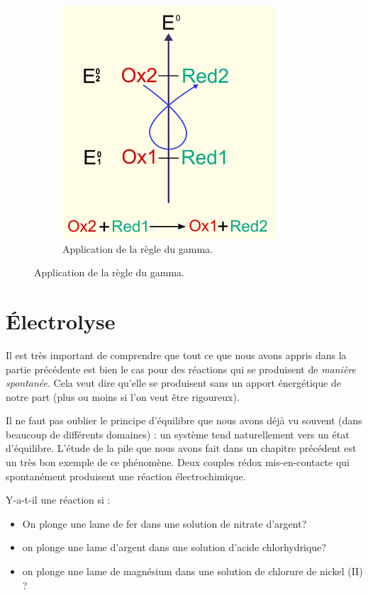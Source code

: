 \documentclass[11pt,a4paper]{article}
\begin{document}
\begin{figure}[H]
\begin{subfigure}{.4\textwidth}
  \includegraphics[width=\linewidth]{imgs/c6/gamma.png}  
  \caption{Application de la règle du gamma.}
\end{subfigure}
\end{figure}


\section{Électrolyse}
Il est très important de comprendre que tout ce que nous avons appris dans la partie précédente est bien le cas pour des réactions qui se produisent de \textit{manière spontanée}. Cela veut dire qu'elle se produisent sans un apport énergétique de notre part (plus ou moins si l'on veut être rigoureux). 

Il ne faut pas oublier le principe d'équilibre que nous avons déjà vu souvent (dans beaucoup de différents domaines) : un système tend naturellement vers un état d'équilibre. L'étude de la pile que nous avons fait dans un chapitre précédent est un très bon exemple de ce phénomène. Deux couples rédox mis-en-contacte qui spontanément produisent une réaction électrochimique. 

\begin{exo}
Y-a-t-il une réaction si : 
\begin{itemize}
    \item On plonge une lame de fer dans une solution de nitrate d'argent? 
    \vspace{1.5cm}
    \item on plonge une lame d'argent dans une solution d'acide chlorhydrique? 
    \vspace{1.5cm}
    \item on plonge une lame de magnésium dans une solution de chlorure de nickel (II) ? 
    \vspace{1.5cm}
\end{itemize}
\end{exo}
\end{document}
